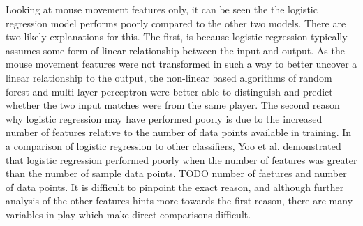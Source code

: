 \documentclass[Report.tex]{subfiles}
\begin{document}
Looking at mouse movement features only, it can be seen the the logistic regression model performs poorly compared to the other two models. There are two likely explanations for this. The first, is because logistic regression typically assumes some form of linear relationship between the input and output. As the mouse movement features were not transformed in such a way to better uncover a linear relationship to the output, the non-linear based algorithms of random forest and multi-layer perceptron were better able to distinguish and predict whether the two input matches were from the same player. The second reason why logistic regression may have performed poorly is due to the increased number of features relative to the number of data points available in training. In a comparison of logistic regression to other classifiers, Yoo et al. \cite{lr-vs-rf} demonstrated that logistic regression performed poorly when the number of features was greater than the number of sample data points. TODO number of faetures and number of data points. It is difficult to pinpoint the exact reason, and although further analysis of the other features hints more towards the first reason, there are many variables in play which make direct comparisons difficult. 
\end{document}
